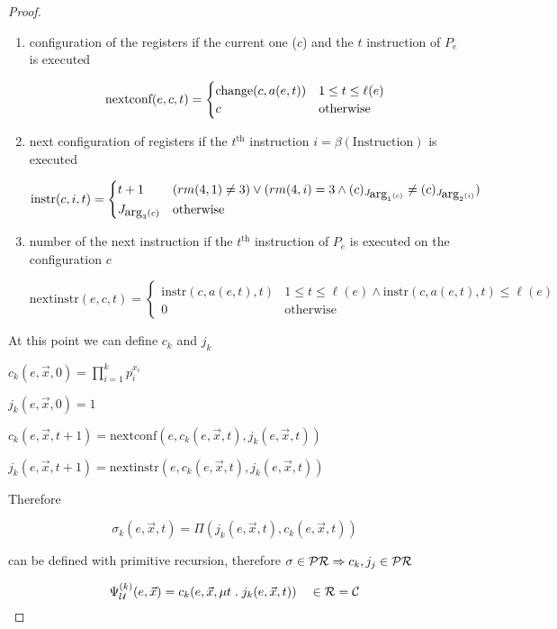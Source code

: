 \begin{theorem}
\begin{proof}
\begin{enumerate}[label=(\alph*)]
  \item configuration of the registers if the current one ($c$) and
    the $t$ instruction of $P_e$ is executed

    \newcommand{\nextconf}{\mbox{nextconf}}
    \[
      \nextconf(e,c,t) = \begin{cases}
        \change(c, a(e,t)) & 1 \leq t \leq \ell(e) \\
        c & \mbox{otherwise}
      \end{cases}
    \]

  \item next configuration of registers if the $t^{\mbox{th}}$
    instruction $i=\beta(\mbox{Instruction})$ is executed

    \newcommand{\instr}{\mbox{instr}}
    \[
      \instr(c, i, t) = \begin{cases}

        t+1 & (rm(4,1) \neq 3) \vee (rm(4,i) = 3 \wedge (c)_{J_{\uarg_1(c)}} \neq (c)_{J_{\uarg_2(i)}}) \\
        J_{\uarg_3(c)} & \mbox{otherwise}
      \end{cases}
    \]

  \item number of the next instruction if the $t^{\mbox{th}}$
    instruction of $P_e$ is executed on the configuration $c$

    \newcommand{\nextinstr}{\mbox{nextinstr}}
    \[
      \nextinstr(e,c,t) = \begin{cases}
        \instr(c, a(e,t), t) & 1 \leq t \leq \ell(e) \wedge \instr(c, a(e,t), t) \leq \ell(e) \\
        0 & \mbox{otherwise}
      \end{cases}
    \]
  \end{enumerate}

  At this point we can define $c_k$ and $j_k$

  $c_k(e, \vec{x}, 0) = \prod_{i=1}^kp_i^{x_i}$

  $j_k(e, \vec{x}, 0) = 1$

  $c_k(e, \vec{x}, t+1) = \mbox{nextconf} (e, c_k(e, \vec{x}, t), j_k(e,\vec{x},t))$

  $j_k(e, \vec{x}, t+1) = \mbox{nextinstr} (e, c_k(e, \vec{x}, t), j_k(e,\vec{x},t))$

  Therefore

  \[
    \sigma_k(e,\vec{x},t) = \Pi(j_k(e,\vec{x},t), c_k(e,\vec{x},t))
  \]

  can be defined with primitive recursion, therefore $\sigma \in \mathcal{PR} \Rightarrow c_k, j_j \in \mathcal{PR}$

  \[
    \Psi_{\mathcal{U}}^{(k)} (e, \vec{x}) = c_k(e, \vec{x}, \mu t \; . \; j_k(e,\vec{x},t)) \quad \in \mathcal{R} = \mathcal{C}
  \]
  \end{proof}
\end{theorem}

